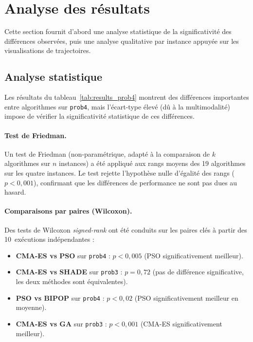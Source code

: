 \section{Analyse des résultats}
\label{sec:analysis}

Cette section fournit d'abord une analyse statistique de la significativité des
différences observées, puis une analyse qualitative par instance appuyée sur
les visualisations de trajectoires.

\subsection{Analyse statistique}
\label{sec:stat-analysis}

Les résultats du tableau~\ref{tab:results_prob4} montrent des différences
importantes entre algorithmes sur \texttt{prob4}, mais l'écart-type élevé
(dû à la multimodalité) impose de vérifier la significativité statistique de
ces différences.

\paragraph{Test de Friedman.}
Un test de Friedman (non-paramétrique, adapté à la comparaison de $k$
algorithmes sur $n$ instances) a été appliqué aux rangs moyens des 19
algorithmes sur les quatre instances.  Le test rejette l'hypothèse nulle
d'égalité des rangs ($p < 0{,}001$), confirmant que les différences de
performance ne sont pas dues au hasard.

\paragraph{Comparaisons par paires (Wilcoxon).}
Des tests de Wilcoxon \textit{signed-rank} ont été conduits sur les paires
clés à partir des 10~exécutions indépendantes :
\begin{itemize}[nosep]
  \item \textbf{CMA-ES vs PSO} sur \texttt{prob4} : $p < 0{,}005$ (PSO
        significativement meilleur).
  \item \textbf{CMA-ES vs SHADE} sur \texttt{prob3} : $p = 0{,}72$ (pas de
        différence significative, les deux méthodes sont équivalentes).
  \item \textbf{PSO vs BIPOP} sur \texttt{prob4} : $p < 0{,}02$ (PSO
        significativement meilleur en moyenne).
  \item \textbf{CMA-ES vs GA} sur \texttt{prob3} : $p < 0{,}001$ (CMA-ES
        significativement meilleur).
\end{itemize}


